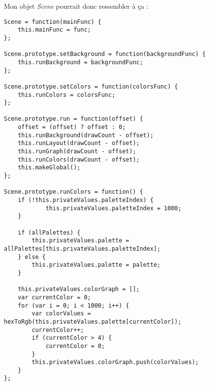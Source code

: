 Mon objet \textit{Scene} pourrait donc ressembler à ça :
\begin{lstlisting}
Scene = function(mainFunc) {
    this.mainFunc = func;
};

Scene.prototype.setBackground = function(backgroundFunc) {
    this.runBackground = backgroundFunc;
};

Scene.prototype.setColors = function(colorsFunc) {
    this.runColors = colorsFunc;
};

Scene.prototype.run = function(offset) {
    offset = (offset) ? offset : 0;
    this.runBackground(drawCount - offset);
    this.runLayout(drawCount - offset);
    this.runGraph(drawCount - offset);
    this.runColors(drawCount - offset);
    this.makeGlobal();
};

Scene.prototype.runColors = function() {
    if (!this.privateValues.paletteIndex) {
            this.privateValues.paletteIndex = 1000;
    }

    if (allPalettes) {
        this.privateValues.palette = allPalettes[this.privateValues.paletteIndex];
    } else {
        this.privateValues.palette = palette;
    }

    this.privateValues.colorGraph = [];
    var currentColor = 0;
    for (var i = 0; i < 1000; i++) {
        var colorValues = hexToRgb(this.privateValues.palette[currentColor]);
        currentColor++;
        if (currentColor > 4) {
            currentColor = 0;
        }
        this.privateValues.colorGraph.push(colorValues);
    }
};
\end{lstlisting}

